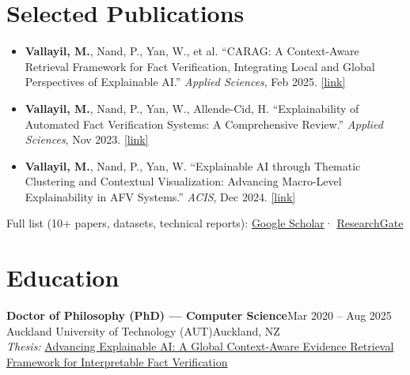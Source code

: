 \documentclass[10.5pt,a4paper]{article}
\newcommand{\edu}[4]{%
  {\bfseries #1}\hfill{\small\color{accent}#2}\\[-1pt]
  {\small\color{mid}#3}\hfill{\small\color{light}#4}\\[2pt]%
}
\begin{document}
\section{Selected Publications}

\begin{itemize}

  \item \textbf{Vallayil, M.}, Nand, P., Yan, W., et al.
        ``CARAG: A Context-Aware Retrieval Framework for Fact Verification, Integrating
        Local and Global Perspectives of Explainable AI.''
        \textit{Applied Sciences}, Feb 2025.
        \href{https://www.mdpi.com/2076-3417/15/4/1970}{\small[link]}

  \item \textbf{Vallayil, M.}, Nand, P., Yan, W., Allende-Cid, H.
        ``Explainability of Automated Fact Verification Systems: A Comprehensive Review.''
        \textit{Applied Sciences}, Nov 2023.
        \href{https://www.mdpi.com/2076-3417/13/23/12608}{\small[link]}

  \item \textbf{Vallayil, M.}, Nand, P., Yan, W.
        ``Explainable AI through Thematic Clustering and Contextual Visualization:
        Advancing Macro-Level Explainability in AFV Systems.''
        \textit{ACIS}, Dec 2024.
        \href{https://aisel.aisnet.org/acis2024/101/}{\small[link]}

\end{itemize}

{\small\color{light}Full list (10+ papers, datasets, technical reports):
\href{https://scholar.google.com/citations?user=6xGoEsMAAAAJ}{Google Scholar}\enspace·\enspace
\href{https://www.researchgate.net/profile/Manju-Vallayil-2}{ResearchGate}}

\section{Education}

\edu{Doctor of Philosophy (PhD) — Computer Science}
    {Mar 2020 – Aug 2025}
    {Auckland University of Technology (AUT)}
    {Auckland, NZ}
{\small\textit{Thesis:} \href{https://openrepository.aut.ac.nz/items/33de7437-821c-4a19-8539-0d38c6848d04}{Advancing Explainable AI: A Global Context-Aware Evidence Retrieval Framework for Interpretable Fact Verification}}
\end{document}
